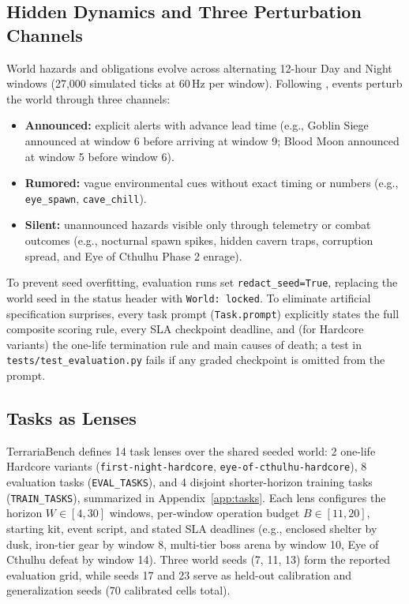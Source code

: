 \documentclass[10pt,letterpaper]{article}
\begin{document}
\subsection{Hidden Dynamics and Three Perturbation Channels}
World hazards and obligations evolve across alternating 12-hour Day and Night windows (27,000 simulated ticks at 60\,Hz per window). Following \citet{raghuvanshi2026storebench}, events perturb the world through three channels:
\begin{itemize}[leftmargin=18pt,itemsep=2pt]
  \item \textbf{Announced:} explicit alerts with advance lead time (e.g., Goblin Siege announced at window 6 before arriving at window 9; Blood Moon announced at window 5 before window 6).
  \item \textbf{Rumored:} vague environmental cues without exact timing or numbers (e.g., \texttt{eye\_spawn}, \texttt{cave\_chill}).
  \item \textbf{Silent:} unannounced hazards visible only through telemetry or combat outcomes (e.g., nocturnal spawn spikes, hidden cavern traps, corruption spread, and Eye of Cthulhu Phase 2 enrage).
\end{itemize}
To prevent seed overfitting, evaluation runs set \texttt{redact\_seed=True}, replacing the world seed in the status header with \texttt{World: locked}. To eliminate artificial specification surprises, every task prompt (\texttt{Task.prompt}) explicitly states the full composite scoring rule, every SLA checkpoint deadline, and (for Hardcore variants) the one-life termination rule and main causes of death; a test in \texttt{tests/test\_evaluation.py} fails if any graded checkpoint is omitted from the prompt.

\subsection{Tasks as Lenses}
TerrariaBench defines 14 task lenses over the shared seeded world: 2 one-life Hardcore variants (\texttt{first-night-hardcore}, \texttt{eye-of-cthulhu-hardcore}), 8 evaluation tasks (\texttt{EVAL\_TASKS}), and 4 disjoint shorter-horizon training tasks (\texttt{TRAIN\_TASKS}), summarized in Appendix~\ref{app:tasks}. Each lens configures the horizon $W \in [4, 30]$ windows, per-window operation budget $B \in [11, 20]$, starting kit, event script, and stated SLA deadlines (e.g., enclosed shelter by dusk, iron-tier gear by window 8, multi-tier boss arena by window 10, Eye of Cthulhu defeat by window 14). Three world seeds (7, 11, 13) form the reported evaluation grid, while seeds 17 and 23 serve as held-out calibration and generalization seeds (70 calibrated cells total).
\end{document}
